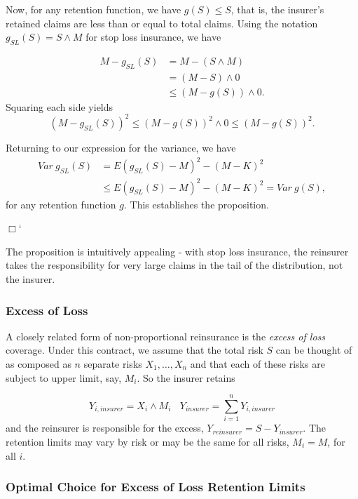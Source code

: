 \documentclass[]{book}
\theoremstyle{definition}
\theoremstyle{definition}
\theoremstyle{definition}
\theoremstyle{remark}
\begin{document}
Now, for any retention function, we have \(g(S) \le S\), that is, the
insurer's retained claims are less than or equal to total claims. Using
the notation \(g_{SL}(S) = S \wedge M\) for stop loss insurance, we have

\[
\begin{array}{ll}
M- g_{SL}(S) &= M-(S \wedge M) \\
&= (M-S) \wedge 0 \\
&\le (M-g(S)) \wedge 0 .
\end{array}
\] Squaring each side yields
\[(M- g_{SL}(S))^2 \le (M-g(S))^2 \wedge 0 \le (M-g(S))^2.\]

Returning to our expression for the variance, we have \[
\begin{array}{ll}
Var~ g_{SL}(S) &= E (g_{SL}(S) -M)^2 -  (M- K)^2 \\
&\le E (g_{SL}(S) -M)^2 -  (M- K)^2 = Var~ g(S) ,
\end{array}
\] for any retention function \(g\). This establishes the proposition.

\(\Box\)`

The proposition is intuitively appealing - with stop loss insurance, the
reinsurer takes the responsibility for very large claims in the tail of
the distribution, not the insurer.

\subsubsection{Excess of Loss}\label{excess-of-loss}

A closely related form of non-proportional reinsurance is the
\emph{excess of loss} coverage. Under this contract, we assume that the
total risk \(S\) can be thought of as composed as \(n\) separate risks
\(X_1, \ldots, X_n\) and that each of these risks are subject to upper
limit, say, \(M_i\). So the insurer retains

\[
Y_{i,insurer} = X_i \wedge M_i \ \ \ \ Y_{insurer} = \sum_{i=1}^n Y_{i,insurer}
\] and the reinsurer is responsible for the excess,
\(Y_{reinsurer}=S - Y_{insurer}\). The retention limits may vary by risk
or may be the same for all risks, \(M_i =M\), for all \(i\).

\subsubsection{Optimal Choice for Excess of Loss Retention
Limits}\label{optimal-choice-for-excess-of-loss-retention-limits}
\end{document}
